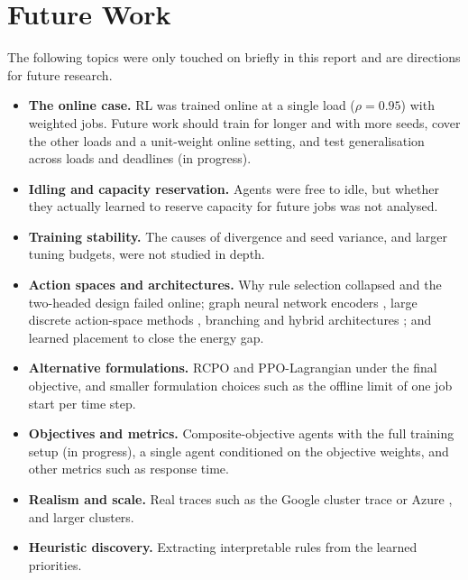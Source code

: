 \documentclass[12pt]{article}
\begin{document}
\section{Future Work}
The following topics were only touched on briefly in this report and are directions for future research.
\begin{itemize}
    \item \textbf{The online case.} RL was trained online at a single load ($\rho = 0.95$) with weighted jobs. Future work should train for longer and with more seeds, cover the other loads and a unit-weight online setting, and test generalisation across loads and deadlines (in progress).
    \item \textbf{Idling and capacity reservation.} Agents were free to idle, but whether they actually learned to reserve capacity for future jobs was not analysed.
    \item \textbf{Training stability.} The causes of divergence and seed variance, and larger tuning budgets, were not studied in depth.
    \item \textbf{Action spaces and architectures.} Why rule selection collapsed and the two-headed design failed online; graph neural network encoders \cite{gnn2024jsspsurvey}, large discrete action-space methods \cite{dulacarnold2015largeactionspaces}, branching \cite{tavakoli2018actionbranching} and hybrid architectures \cite{ml_ra_litrev2025}; and learned placement to close the energy gap.
    \item \textbf{Alternative formulations.} RCPO and PPO-Lagrangian under the final objective, and smaller formulation choices such as the offline limit of one job start per time step.
    \item \textbf{Objectives and metrics.} Composite-objective agents with the full training setup (in progress), a single agent conditioned on the objective weights, and other metrics such as response time.
    \item \textbf{Realism and scale.} Real traces such as the Google cluster trace \cite{reiss2012googletrace} or Azure \cite{cortez2017resourcecentral}, and larger clusters.
    \item \textbf{Heuristic discovery.} Extracting interpretable rules from the learned priorities.
\end{itemize}
\end{document}

